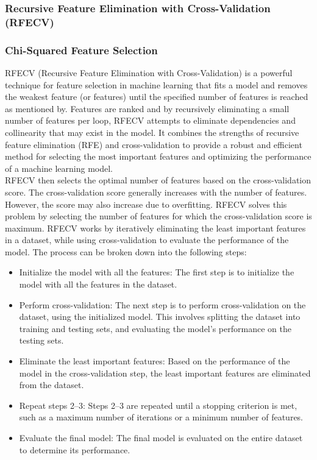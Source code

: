 \documentclass[12pt]{report}
\begin{document}
\subsubsection*{Recursive Feature Elimination with Cross-Validation (RFECV)}
\subsubsection*{Chi-Squared Feature Selection}
RFECV (Recursive Feature Elimination with Cross-Validation) is a powerful
technique for feature selection in machine learning that fits a model and
removes the weakest feature (or features) until the specified number of
features is reached as mentioned by\cite{guyon2002}. Features are ranked and
by recursively eliminating a small number of features per loop, RFECV attempts
to eliminate dependencies and collinearity that may exist in the model. It
combines the strengths of recursive feature elimination (RFE) and
cross-validation to provide a robust and efficient method for selecting the
most important features and optimizing the performance of a machine learning
model.\\

RFECV then selects the optimal number of features based on the cross-validation
score. The cross-validation score generally increases with the number of
features. However, the score may also increase due to overfitting. RFECV solves
this problem by selecting the number of features for which the cross-validation
score is maximum. RFECV works by iteratively eliminating the least important
features in a dataset, while using cross-validation to evaluate the performance
of the model. The process can be broken down into the following steps:

\begin{itemize}
    \item Initialize the model with all the features: The first step is to initialize the
          model with all the features in the dataset.
    \item Perform cross-validation: The next step is to perform cross-validation on the
          dataset, using the initialized model. This involves splitting the dataset into
          training and testing sets, and evaluating the model's performance on the
          testing sets.
    \item Eliminate the least important features: Based on the performance of the model
          in the cross-validation step, the least important features are eliminated from
          the dataset.
    \item Repeat steps 2--3: Steps 2--3 are repeated until a stopping criterion is met,
          such as a maximum number of iterations or a minimum number of features.
    \item Evaluate the final model: The final model is evaluated on the entire dataset to
          determine its performance.
\end{itemize}
\end{document}
